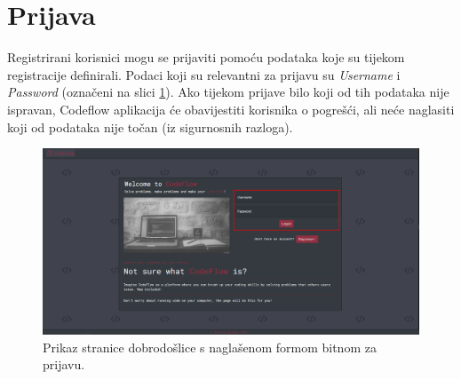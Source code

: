 \documentclass[times, utf8, zavrsni]{fer}
\begin{document}
		\section{Prijava}
		Registrirani korisnici mogu se prijaviti pomoću podataka koje su tijekom registracije definirali. Podaci koji su relevantni za prijavu su \textit{Username} i \textit{Password} (označeni na slici \ref{fig:login}). Ako tijekom prijave bilo koji od tih podataka nije ispravan, Codeflow aplikacija će obavijestiti korisnika o pogrešći, ali neće naglasiti koji od podataka nije točan (iz sigurnosnih razloga).
		\begin{figure}[htb]
			\centering
			\includegraphics[width=\linewidth]{pictures/koristenje/Prijava.png}
			\caption{Prikaz stranice dobrodošlice s naglašenom formom bitnom za prijavu.}
			\label{fig:login}
		\end{figure}
	
\end{document}
